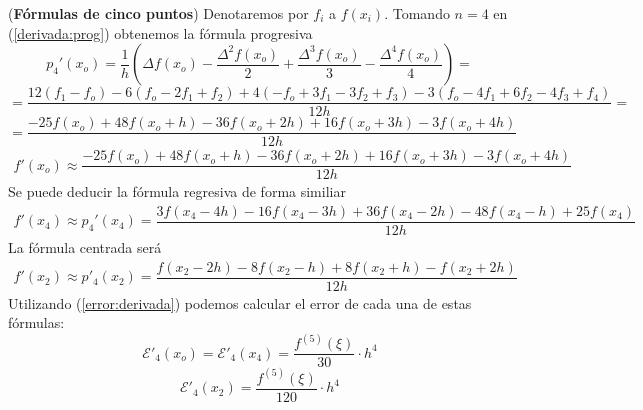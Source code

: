             \begin{ejes}
            (\textbf{Fórmulas de cinco puntos}) Denotaremos por $f_i$ a $f(x_i)$. 
            Tomando $n=4$ en (\ref{derivada:prog}) obtenemos la fórmula progresiva
            $$ p_4'(x_o)=\dfrac{1}{h}\left(\Delta f(x_o) -\dfrac{\Delta^2f(x_o)}{2}+ \dfrac{\Delta^3f(x_o)}{3}-\dfrac{\Delta^4f(x_o)}{4}\right)=$$
            $$=\dfrac{12(f_1-f_o)-6(f_o-2f_1+f_2)+4(-f_o+3f_1-3f_2+f_3)-3(f_o-4f_1+6f_2-4f_3+f_4)}{12h}=$$           $$=\dfrac{-25f(x_o)+48f(x_o+h)-36f(x_o+2h)+16f(x_o+3h)-3f(x_o+4h)}{12h}$$
            \begin{align}
            f'(x_o)\approx \dfrac{-25f(x_o)+48f(x_o+h)-36f(x_o+2h)+16f(x_o+3h)-3f(x_o+4h)}{12h}
            \label{prog:5}
            \end{align}
            Se puede deducir la fórmula regresiva de forma similiar
            \begin{align}
            f'(x_4)\approx p_4'(x_4)=\dfrac{3f(x_4-4h)-16f(x_4-3h)+36f(x_4-2h)-48f(x_4-h)+25f(x_4)}{12h}
            \label{reg:5}
            \end{align}           
            La fórmula centrada será
            \begin{align}
            f'(x_2)\approx p'_4(x_2)=\dfrac{f(x_2-2h)-8f(x_2-h)+8f(x_2+h)-f(x_2+2h)}{12h} 
            \label{cent:5}
            \end{align}
            Utilizando (\ref{error:derivada}) podemos calcular el error de cada una de estas fórmulas:
            $$\mathcal{E}'_4(x_o)=\mathcal{E}'_4(x_4)=\dfrac{f^{(5)}(\xi)}{30}\cdot h^4$$
            $$\mathcal{E}'_4(x_2)=\dfrac{f^{(5)}(\xi)}{120}\cdot h^4$$

            \end{ejes}
            
